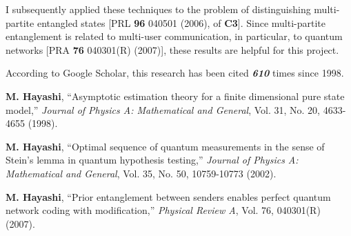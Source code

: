 I subsequently applied these techniques 
to the problem of distinguishing multi-partite entangled states [PRL \textbf{96} 040501 (2006), \cite{HMMOV03} of \textbf{C3}]. %
Since multi-partite entanglement is related to multi-user communication, in particular, to quantum networks 
[PRA \textbf{76} 040301(R) (2007)], %
these results are helpful for this project. 

According to Google Scholar, this research has been cited \textbf{\textit{610}}  
times since 1998.

\renewcommand{\refname}{}
\vspace{-20 mm}
\begin{thebibliography}{99}

\textbf{M. Hayashi},
``Asymptotic estimation theory for a finite dimensional pure state model,'' 
{\em Journal of Physics A: Mathematical and General}, Vol. 31, No. 20, 4633-4655 (1998).

\textbf{M. Hayashi},
``Optimal sequence of quantum measurements in the sense of Stein's lemma in quantum hypothesis testing,'' 
{\em Journal of Physics A: Mathematical and General}, Vol. 35, No. 50, 10759-10773 (2002).

\textbf{M. Hayashi},
``Prior entanglement between senders enables perfect quantum network coding with modification,'' 
{\em Physical Review A}, Vol. 76, 040301(R) (2007).

\end{thebibliography}


